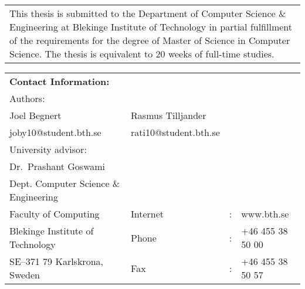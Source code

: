 \documentclass[a4paper,oneside]{bth}
\begin{document}
{\pagestyle{empty}
\changepage{5cm}{1cm}{-0.5cm}{-0.5cm}{}{-2cm}{}{}{}
\noindent%
\begin{tabular}{p{\textwidth}}
{\small This thesis is submitted to the Department of Computer Science \& Engineering at Blekinge
Institute of Technology in partial fulfillment of the requirements for the degree of Master
of Science in Computer Science. The thesis is equivalent to 20 weeks of
full-time studies.}
\end{tabular}

\par\vspace {12cm}

\noindent%
\begin{tabular}{p{}lcl}
\textbf{Contact Information:}\\
Authors:\\
Joel Begnert               & Rasmus Tilljander\\
joby10@student.bth.se      & rati10@student.bth.se\\
\par\vspace {5cm}
University advisor:\\
Dr.\ Prashant Goswami\\
Dept. Computer Science \& Engineering
\par\vspace {1cm}
\noindent%
 \\
Faculty of Computing & Internet & : & www.bth.se\\
Blekinge Institute of Technology & Phone	& : & +46 455 38 50 00 \\
SE--371 79 Karlskrona, Sweden & Fax & : & +46 455 38 50 57 \\
\end{tabular}
\clearpage
} %

\setcounter{page}{1}

\end{document}
